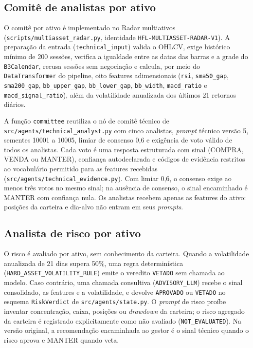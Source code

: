 \subsection{Comitê de analistas por ativo}

O comitê por ativo é implementado no Radar multiativos (\texttt{scripts/multiasset\_radar.py}, identidade \texttt{HFL-MULTIASSET-RADAR-V1}). A preparação da entrada (\texttt{technical\_input}) valida o OHLCV, exige histórico mínimo de 200 sessões, verifica a igualdade entre as datas das barras e a grade do \texttt{B3Calendar}, recusa sessões sem negociação e calcula, por meio do \texttt{DataTransformer} do pipeline, oito features adimensionais (\texttt{rsi}, \texttt{sma50\_gap}, \texttt{sma200\_gap}, \texttt{bb\_upper\_gap}, \texttt{bb\_lower\_gap}, \texttt{bb\_width}, \texttt{macd\_ratio} e \texttt{macd\_signal\_ratio}), além da volatilidade anualizada dos últimos 21 retornos diários.

A função \texttt{committee} reutiliza o nó de comitê técnico de \texttt{src/agents/technical\_analyst.py} com cinco analistas, \textit{prompt} técnico versão 5, sementes 10001 a 10005, limiar de consenso 0,6 e exigência de voto válido de todos os analistas. Cada voto é uma resposta estruturada com sinal (COMPRA, VENDA ou MANTER), confiança autodeclarada e códigos de evidência restritos ao vocabulário permitido para as features recebidas (\texttt{src/agents/technical\_evidence.py}). Com limiar 0,6, o consenso exige ao menos três votos no mesmo sinal; na ausência de consenso, o sinal encaminhado é MANTER com confiança nula. Os analistas recebem apenas as features do ativo: posições da carteira e dia-alvo não entram em seus \textit{prompts}.

\subsection{Analista de risco por ativo}

O risco é avaliado por ativo, sem conhecimento da carteira. Quando a volatilidade anualizada de 21 dias supera 50\%, uma regra determinística (\texttt{HARD\_ASSET\_VOLATILITY\_RULE}) emite o veredito \texttt{VETADO} sem chamada ao modelo. Caso contrário, uma chamada consultiva (\texttt{ADVISORY\_LLM}) recebe o sinal consolidado, as features e a volatilidade, e devolve \texttt{APROVADO} ou \texttt{VETADO} no esquema \texttt{RiskVerdict} de \texttt{src/agents/state.py}. O \textit{prompt} de risco proíbe inventar concentração, caixa, posições ou \textit{drawdown} da carteira; o risco agregado da carteira é registrado explicitamente como não avaliado (\texttt{NOT\_EVALUATED}). Na versão original, a recomendação encaminhada ao gestor é o sinal técnico quando o risco aprova e MANTER quando veta.

